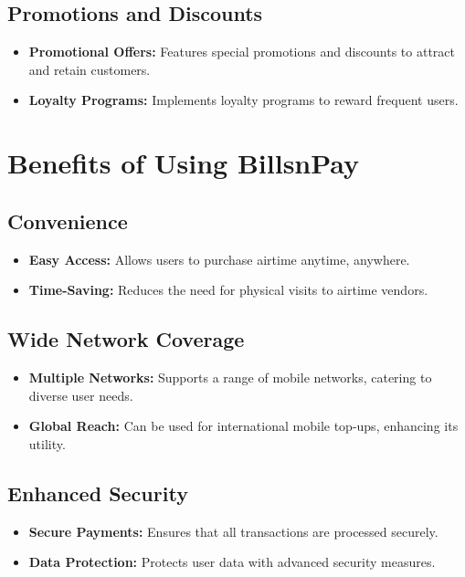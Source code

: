 \documentclass[a4paper,12pt]{report}
\begin{document}
	\subsection{Promotions and Discounts}
	\begin{itemize}
		\item \textbf{Promotional Offers:} Features special promotions and discounts to attract and retain customers.
		\item \textbf{Loyalty Programs:} Implements loyalty programs to reward frequent users.
	\end{itemize}
	
	\section{Benefits of Using BillsnPay}
	
	\subsection{Convenience}
	\begin{itemize}
		\item \textbf{Easy Access:} Allows users to purchase airtime anytime, anywhere.
		\item \textbf{Time-Saving:} Reduces the need for physical visits to airtime vendors.
	\end{itemize}
	
	\subsection{Wide Network Coverage}
	\begin{itemize}
		\item \textbf{Multiple Networks:} Supports a range of mobile networks, catering to diverse user needs.
		\item \textbf{Global Reach:} Can be used for international mobile top-ups, enhancing its utility.
	\end{itemize}
	
	\subsection{Enhanced Security}
	\begin{itemize}
		\item \textbf{Secure Payments:} Ensures that all transactions are processed securely.
		\item \textbf{Data Protection:} Protects user data with advanced security measures.
	\end{itemize}
	
\end{document}
